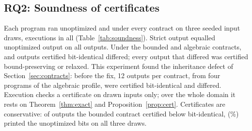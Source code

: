 \documentclass[acmsmall,review,anonymous,nonacm]{acmart}
\begin{document}
\subsection{RQ2: Soundness of certificates}\label{sec:rq2}
\begin{table}[t]
\caption{RQ2. Outputs of \RqTwoPrograms{} executed programs on three input
seeds, compared bit for bit with the unoptimized program.}\label{tab:soundness}
\centering\footnotesize
\end{table}
Each program ran unoptimized and under every contract on three seeded input
draws, \RqTwoRuns{} executions in all (Table~\ref{tab:soundness}). Strict output
equalled unoptimized output on all \RqTwoOutputsStrict{} outputs. Under the
bounded and algebraic contracts, \RqTwoBitwiseDifferBounded{} and
\RqTwoBitwiseDifferAlgebraic{} outputs certified bit-identical differed; every
output that differed was certified bound-preserving or relaxed. This experiment
found the inheritance defect of Section~\ref{sec:contracts}: before the fix, 12
outputs per contract, from four programs of the algebraic profile, were
certified bit-identical and differed. Execution checks a certificate on drawn
inputs only; over the whole domain it rests on Theorem~\ref{thm:exact} and
Proposition~\ref{prop:cert}. Certificates are conservative: of
\RqTwoWeakerBounded{} outputs the bounded contract certified below
bit-identical, \RqTwoPessimisticBounded{} (\RqTwoPessimisticPctBounded\%)
printed the unoptimized bits on all three draws.
\end{document}
